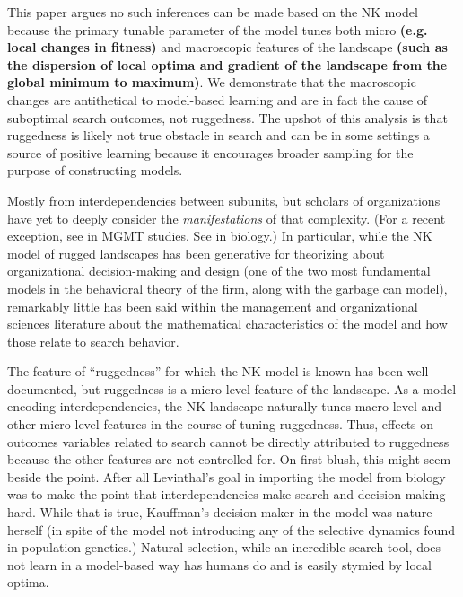 \documentclass[12pt]{article}
\begin{document}
This paper argues no such inferences can be made based on the NK model because the primary tunable parameter of the model tunes both micro \textbf{(e.g. local changes in fitness)} and macroscopic features of the landscape \textbf{(such as the dispersion of local optima and gradient of the landscape from the global minimum to maximum)}. We demonstrate that the macroscopic changes are antithetical to model-based learning and are in fact the cause of suboptimal search outcomes, not ruggedness. The upshot of this analysis is that ruggedness is likely not true obstacle in search and can be in some settings a source of positive learning because it encourages broader sampling for the purpose of constructing models.





Mostly from interdependencies between subunits, but scholars of organizations have yet to deeply consider the \textit{manifestations} of that complexity. (For a recent exception, see \citet{Rahmandad2019} in MGMT studies. See \citet{Newman1998} in biology.) In particular, while the NK model of rugged landscapes \cite{Kauffman1989,Levinthal2007,Rivkin2000} has been generative for theorizing about organizational decision-making and design (one of the two most fundamental models in the behavioral theory of the firm, along with the garbage can model), remarkably little has been said within the management and organizational sciences literature about the mathematical characteristics of the model and how those relate to search behavior.

The feature of ``ruggedness'' for which the NK model is known has been well documented, but ruggedness is a micro-level feature of the landscape. As a model encoding interdependencies, the NK landscape naturally tunes macro-level and other micro-level features in the course of tuning ruggedness. Thus, effects on outcomes variables related to search cannot be directly attributed to ruggedness because the other features are not controlled for. On first blush, this might seem beside the point. After all Levinthal's goal in importing the model from biology was to make the point that interdependencies make search and decision making hard. While that is true, Kauffman's decision maker in the model was nature herself (in spite of the model not introducing any of the selective dynamics found in population genetics.) Natural selection, while an incredible search tool, does not learn in a model-based way has humans do and is easily stymied by local optima.
\end{document}
